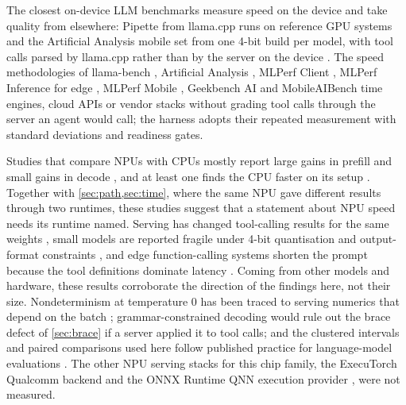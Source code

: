 \documentclass[11pt]{article}
\begin{document}
The closest on-device LLM benchmarks measure speed on the device and take quality from elsewhere: Pipette from llama.cpp runs on reference GPU systems \citep{pipette,pipetteMethod} and the Artificial Analysis mobile set from one 4-bit build per model, with tool calls parsed by llama.cpp rather than by the server on the device \citep{aaMobile,aaMobileMethod}. The speed methodologies of llama-bench \citep{llamabench}, Artificial Analysis \citep{aaPerfMethod}, MLPerf Client \citep{mlperfClient}, MLPerf Inference for edge \citep{mlperfInference}, MLPerf Mobile \citep{mlperfMobile}, Geekbench AI \citep{geekbenchAI} and MobileAIBench \citep{mobileaibench} time engines, cloud APIs or vendor stacks without grading tool calls through the server an agent would call; the harness adopts their repeated measurement with standard deviations and readiness gates.

Studies that compare NPUs with CPUs mostly report large gains in prefill and small gains in decode \citep{npuFast,snapdragonRAG}, and at least one finds the CPU faster on its setup \citep{npuNotFaster}. Together with \cref{sec:path,sec:time}, where the same NPU gave different results through two runtimes, these studies suggest that a statement about NPU speed needs its runtime named. Serving has changed tool-calling results for the same weights \citep{k2verifier,vllmKimi}, small models are reported fragile under 4-bit quantisation and output-format constraints \citep{smallModelsBigTasks,smallReasoningFC,beyondFluent}, and edge function-calling systems shorten the prompt because the tool definitions dominate latency \citep{tinyagent,octopusv2}. Coming from other models and hardware, these results corroborate the direction of the findings here, not their size. Nondeterminism at temperature 0 has been traced to serving numerics that depend on the batch \citep{nondeterminism,thinkingMachines}; grammar-constrained decoding \citep{guidedGeneration,xgrammar} would rule out the brace defect of \cref{sec:brace} if a server applied it to tool calls; and the clustered intervals and paired comparisons used here follow published practice for language-model evaluations \citep{errorBars}. The other NPU serving stacks for this chip family, the ExecuTorch Qualcomm backend \citep{executorch} and the ONNX Runtime QNN execution provider \citep{onnxQnn}, were not measured.
\end{document}

